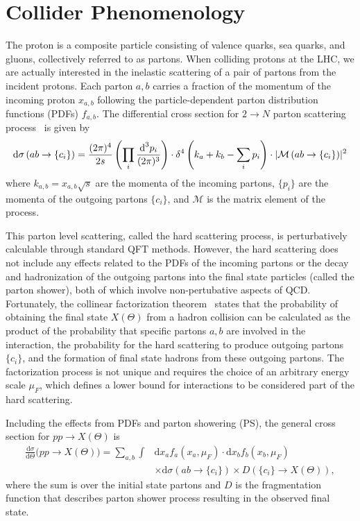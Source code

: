 \section{Collider Phenomenology}
\label{sec:collider_pheno}

The proton is a composite particle consisting of valence quarks, sea quarks, and gluons, collectively referred to as partons.
When colliding protons at the LHC, we are actually interested in the inelastic scattering of a pair of partons from the incident protons.
Each parton $a,b$ carries a fraction of the momentum of the incoming proton $x_{a,b}$ following the particle-dependent parton distribution functions (PDFs) $f_{a,b}$.
The differential cross section for $2\rightarrow N$ parton scattering process~\cite{Perelstein2010} is given by
\begin{equation}
  \text{d}\sigma \left(ab \rightarrow \{c_i\} \right) =
  \frac{(2\pi)^4}{2s} \left( \prod_i \frac{\text{d}^3 p_i}{(2\pi)^3} \right)
  \cdot \delta^4 \left(k_a + k_b - \sum_i p_i \right)
  \cdot \lvert  \mathcal{M} \left(ab \rightarrow \{c_i\} \right) \rvert^2
\end{equation}
where $k_{a,b} = x_{a,b} \sqrt{s}$ are the momenta of the incoming partons, $\{p_i\}$ are the momenta of the outgoing partons $\{c_i\}$, and $\mathcal{M}$ is the matrix element of the process.

This parton level scattering, called the hard scattering process, is perturbatively calculable through standard QFT methods.
However, the hard scattering does not include any effects related to the PDFs of the incoming partons or the decay and hadronization of the outgoing partons into the final state particles (called the parton shower), both of which involve non-pertubative aspects of QCD.
Fortunately, the collinear factorization theorem~\cite{Collins1989} states that the probability of obtaining the final state $X(\Theta)$ from a hadron collision can be calculated as the product of the probability that specific partons $a,b$ are involved in the interaction, the probability for the hard scattering to produce outgoing partons $\{c_i\}$, and the formation of final state hadrons from these outgoing partons.
The factorization process is not unique and requires the choice of an arbitrary energy scale $\mu_F$, which defines a lower bound for interactions to be considered part of the hard scattering.

Including the effects from PDFs and parton showering (PS), the general cross section for $pp \rightarrow X(\Theta)$ is
\begin{align}
  \label{eqn:ppx}
  \frac{\text{d}\sigma}{\text{d}\Theta} \Big(pp \rightarrow X(\Theta) \Big) =
  \sum_{a,b} \int & \text{d} x_a f_a(x_a, \mu_F) \cdot \text{d} x_b f_b(x_b, \mu_F)  \nonumber \\
  & \times \text{d}\sigma \left(ab \rightarrow \{c_i\} \right)
  \times D \left( \{c_i\} \rightarrow X(\Theta) \right), 
\end{align}
where the sum is over the initial state partons and $D$ is the
fragmentation function that describes parton shower process resulting
in the observed final state.

